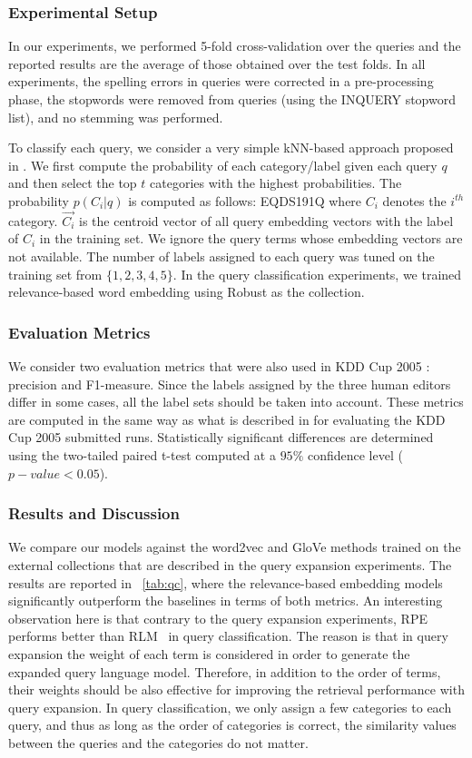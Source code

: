 \documentclass[sigconf]{acmart}
\begin{document}
\subsubsection{Experimental Setup}
In our experiments, we performed 5-fold cross-validation over the queries and the reported results are the average of those obtained over the test folds. In all experiments, the spelling errors in queries were corrected in a pre-processing phase, the stopwords were removed from queries (using the INQUERY stopword list), and no stemming was performed.

To classify each query, we consider a very simple kNN-based approach proposed in \cite{Zamani:2016:ICTIR:pqv}. We first compute the probability of each category/label given each query $q$ and then select the top $t$ categories with the highest probabilities. The probability $p (C_i | q)$ is computed as follows:
EQDS191Q
where $C_i$ denotes the $i^{th}$ category. $\vec{C_i}$ is the centroid vector of all query embedding vectors with the label of $C_i$ in the training set. We ignore the query terms whose embedding vectors are not available. The number of labels assigned to each query was tuned on the training set from $\{1, 2, 3, 4, 5\}$. In the query classification experiments, we trained relevance-based word embedding using Robust as the collection. 

\subsubsection{Evaluation Metrics} We consider two evaluation metrics that were also used in KDD Cup 2005 \cite{Li:2005}: precision and F1-measure. Since the labels assigned by the three human editors differ in some cases, all the label sets should be taken into account. These metrics are computed in the same way as what is described in \cite{Li:2005} for evaluating the KDD Cup 2005 submitted runs. Statistically significant differences are determined using the two-tailed paired t-test computed at a $95\%$ confidence level ($p-value < 0.05$).

\subsubsection{Results and Discussion}
We compare our models against the word2vec and GloVe methods trained on the external collections that are described in the query expansion experiments. The results are reported in \tablename~\ref{tab:qc}, where the relevance-based embedding models significantly outperform the baselines in terms of both metrics. An interesting observation here is that contrary to the query expansion experiments, {RPE~} performs better than {RLM~} in query classification. The reason is that in query expansion the weight of each term is considered in order to generate the expanded query language model. Therefore, in addition to the order of terms, their weights should be also effective for improving the retrieval performance with query expansion. In query classification, we only assign a few categories to each query, and thus as long as the order of categories is correct, the similarity values between the queries and the categories do not matter. 
\end{document}
